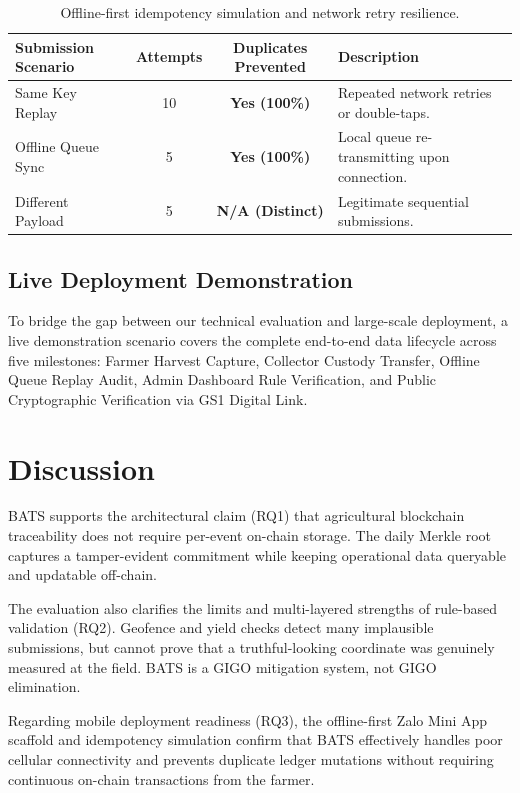 \documentclass[runningheads]{llncs}
\begin{document}
\begin{table}[H]
\centering
\caption{Offline-first idempotency simulation and network retry resilience.}
\label{tab:idempotency}
\begin{tabularx}{\textwidth}{@{}lccl@{}}
\toprule
\textbf{Submission Scenario} & \textbf{Attempts} & \textbf{Duplicates Prevented} & \textbf{Description} \\ \midrule
Same Key Replay & 10 & \textbf{Yes (100\%)} & Repeated network retries or double-taps. \\
Offline Queue Sync & 5 & \textbf{Yes (100\%)} & Local queue re-transmitting upon connection. \\
Different Payload & 5 & \textbf{N/A (Distinct)} & Legitimate sequential submissions. \\ \bottomrule
\end{tabularx}
\end{table}

\subsection{Live Deployment Demonstration}

To bridge the gap between our technical evaluation and large-scale deployment, a live demonstration scenario covers the complete end-to-end data lifecycle across five milestones: Farmer Harvest Capture, Collector Custody Transfer, Offline Queue Replay Audit, Admin Dashboard Rule Verification, and Public Cryptographic Verification via GS1 Digital Link.

\section{Discussion}

BATS supports the architectural claim (RQ1) that agricultural blockchain traceability does not require per-event on-chain storage. The daily Merkle root captures a tamper-evident commitment while keeping operational data queryable and updatable off-chain. 

The evaluation also clarifies the limits and multi-layered strengths of rule-based validation (RQ2). Geofence and yield checks detect many implausible submissions, but cannot prove that a truthful-looking coordinate was genuinely measured at the field. BATS is a GIGO mitigation system, not GIGO elimination.

Regarding mobile deployment readiness (RQ3), the offline-first Zalo Mini App scaffold and idempotency simulation confirm that BATS effectively handles poor cellular connectivity and prevents duplicate ledger mutations without requiring continuous on-chain transactions from the farmer.
\end{document}
